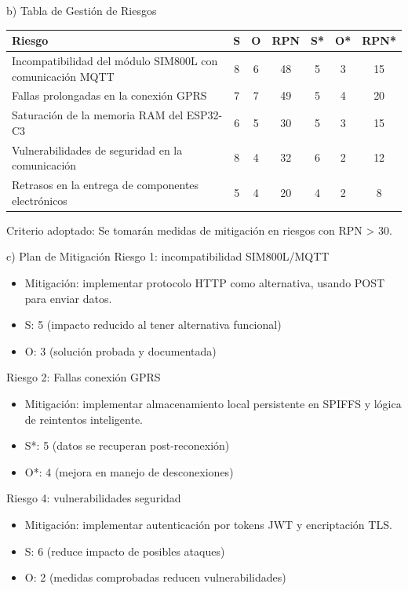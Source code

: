 \documentclass[
11pt, %
]{charter}
\begin{document}
b) Tabla de Gestión de Riesgos

\begin{table}[htpb]
\centering
\begin{tabularx}{\linewidth}{@{}|X|c|c|c|c|c|c|@{}}
\hline
\rowcolor[HTML]{C0C0C0} 
Riesgo & S & O & RPN & S* & O* & RPN* \\ \hline
Incompatibilidad del módulo SIM800L con comunicación MQTT & 8 & 6 & 48 & 5 & 3 & 15 \\ \hline
Fallas prolongadas en la conexión GPRS & 7 & 7 & 49 & 5 & 4 & 20 \\ \hline
Saturación de la memoria RAM del ESP32-C3 & 6 & 5 & 30 & 5 & 3 & 15 \\ \hline
Vulnerabilidades de seguridad en la comunicación & 8 & 4 & 32 & 6 & 2 & 12 \\ \hline
Retrasos en la entrega de componentes electrónicos & 5 & 4 & 20 & 4 & 2 & 8 \\ \hline
\end{tabularx}%
\end{table}

Criterio adoptado:
Se tomarán medidas de mitigación en riesgos con RPN > 30.

c) Plan de Mitigación
Riesgo 1: incompatibilidad SIM800L/MQTT
\begin{itemize}
\item Mitigación: implementar protocolo HTTP como alternativa, usando POST para enviar datos.
\item S: 5 (impacto reducido al tener alternativa funcional)
\item O: 3 (solución probada y documentada)
\end{itemize}

Riesgo 2: Fallas conexión GPRS
\begin{itemize}
\item Mitigación: implementar almacenamiento local persistente en SPIFFS y lógica de reintentos inteligente.
\item S*: 5 (datos se recuperan post-reconexión)
\item O*: 4 (mejora en manejo de desconexiones)
\end{itemize}

Riesgo 4: vulnerabilidades seguridad
\begin{itemize}
\item Mitigación: implementar autenticación por tokens JWT y encriptación TLS.
\item S: 6 (reduce impacto de posibles ataques)
\item O: 2 (medidas comprobadas reducen vulnerabilidades)
\end{itemize}
\end{document}
